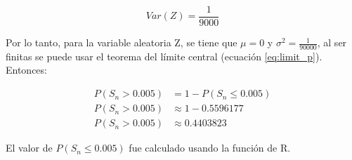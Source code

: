 \begin{equation*}
    Var(Z) = \frac{1}{9000}
\end{equation*}

Por lo tanto, para la variable aleatoria Z, se tiene que $\mu=0$ y $\sigma^2 = \frac{1}{90000}$, al ser finitas se puede usar el teorema del límite central (ecuación \ref{eq:limit_p}). Entonces:

\begin{align*}
    P(S_n>0.005) & = 1- P(S_n \leq 0.005) \\
    P(S_n>0.005) & \approx 1 - 0.5596177  \\
    P(S_n>0.005) & \approx 0.4403823
\end{align*}

El valor de $P(S_n \leq 0.005)$ fue calculado usando la función  de R.